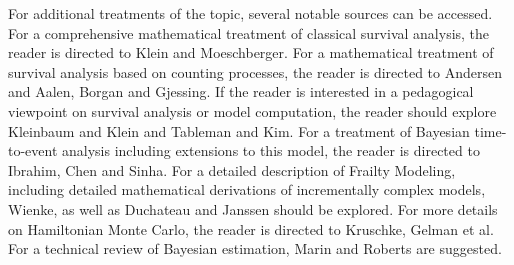 For additional treatments of the topic, several notable sources can be accessed. For a comprehensive mathematical treatment of classical survival analysis, the reader is directed to Klein and Moeschberger\cite{Klein2003}. For a mathematical treatment of survival analysis based on counting processes, the reader is directed to Andersen\cite{Andersen1992} and Aalen, Borgan and Gjessing\cite{Aalen2008}. If the reader is interested in a pedagogical viewpoint on survival analysis or model computation, the reader should explore Kleinbaum and Klein\cite{Kleinbaum2005} and Tableman and Kim\cite{Tableman2004}. For a treatment of Bayesian time-to-event analysis including extensions to this model, the reader is directed to Ibrahim, Chen and Sinha\cite{Ibrahim2005}. For a detailed description of Frailty Modeling, including detailed mathematical derivations of incrementally complex models, Wienke\cite{Wienke2010}, as well as Duchateau and Janssen\cite{Duchateau2008} should be explored. For more details on Hamiltonian Monte Carlo, the reader is directed to Kruschke\cite{Kruschke2015}, Gelman et al\cite{Gelman2014}. For a technical review of Bayesian estimation, Marin and Roberts\cite{Marin2007} are suggested.


